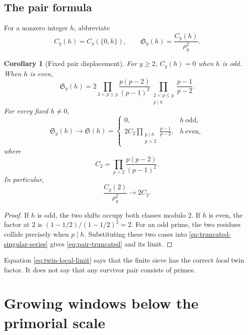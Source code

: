 \documentclass[11pt]{article}
\newtheorem{corollary}[theorem]{Corollary}
\theoremstyle{definition}
\theoremstyle{remark}
\begin{document}
\subsection{The pair formula}

For a nonzero integer $h$, abbreviate
\[
    C_y(h)=C_y(\{0,h\}),
    \qquad
    \mathfrak S_y(h)=\frac{C_y(h)}{\rho_y^2}.
\]

\begin{corollary}[Fixed pair displacement]\label{cor:pair-formula}
For $y\ge2$, $C_y(h)=0$ when $h$ is odd.  When $h$ is even,
\begin{equation}\label{eq:pair-truncated}
 \mathfrak S_y(h)
 =2\prod_{2<p\le y}\frac{p(p-2)}{(p-1)^2}
   \prod_{\substack{2<p\le y\\p\mid h}}\frac{p-1}{p-2}.
\end{equation}
For every fixed $h\ne0$,
\begin{equation}\label{eq:pair-limit}
 \mathfrak S_y(h)\longrightarrow \mathfrak S(h)
 =\begin{cases}
 0,&h\ \text{odd},\\[0.4em]
 2C_2\displaystyle\prod_{\substack{p\mid h\\p>2}}
       \frac{p-1}{p-2},&h\ \text{even},
 \end{cases}
\end{equation}
where
\begin{equation}\label{eq:twin-constant}
    C_2=\prod_{p>2}\frac{p(p-2)}{(p-1)^2}.
\end{equation}
In particular,
\begin{equation}\label{eq:twin-local-limit}
    \frac{C_y(2)}{\rho_y^2}\longrightarrow2C_2.
\end{equation}
\end{corollary}

\begin{proof}
If $h$ is odd, the two shifts occupy both classes modulo $2$.  If $h$ is even, the factor at $2$ is $(1-1/2)/(1-1/2)^2=2$.  For an odd prime, the two residues collide precisely when $p\mid h$.  Substituting these two cases into \eqref{eq:truncated-singular-series} gives \eqref{eq:pair-truncated} and its limit.
\end{proof}

Equation \eqref{eq:twin-local-limit} says that the finite sieve has the correct \emph{local} twin factor.  It does not say that any survivor pair consists of primes.

\section{Growing windows below the primorial scale}\label{sec:windows}
\end{document}
